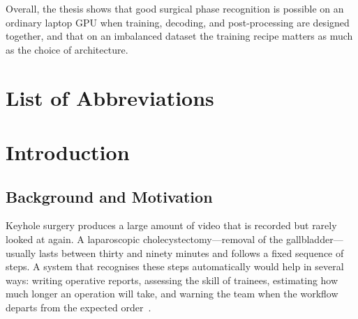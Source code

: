\documentclass[11pt,a4paper]{report}
\begin{document}
Overall, the thesis shows that good surgical phase recognition is possible on an ordinary laptop GPU when training, decoding, and post-processing are designed together, and that on an imbalanced dataset the training recipe matters as much as the choice of architecture.

\tableofcontents
\listoffigures
\listoftables

\chapter*{List of Abbreviations}

\begin{acronym}[MICCAI]
\end{acronym}

\chapter{Introduction}

\section{Background and Motivation}

Keyhole surgery produces a large amount of video that is recorded but rarely looked at again. A laparoscopic cholecystectomy---removal of the gallbladder---usually lasts between thirty and ninety minutes and follows a fixed sequence of steps. A system that recognises these steps automatically would help in several ways: writing operative reports, assessing the skill of trainees, estimating how much longer an operation will take, and warning the team when the workflow departs from the expected order~\cite{maierhein2017surgical,vedula2017objective}.
\end{document}
